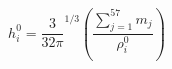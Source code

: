 \documentclass[12pt]{article}
\begin{document}
$$
  h_i^0 = \frac{3}{32\pi}^{1/3} \left( \frac{\sum_{j=1}^{57} m_j}{\rho_i^0} \right)
$$  
\end{document}
